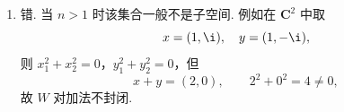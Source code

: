 \begin{enumerate}
\begin{enumerate}
        \item 错. 当 $n>1$ 时该集合一般不是子空间. 例如在 $\mathbf{C}^2$ 中取
        \[
            x=(1,\i),\quad y=(1,-\i),
        \]
        则 $x_1^2+x_2^2=0$，$y_1^2+y_2^2=0$，但
        \[
            x+y=(2,0),\qquad 2^2+0^2=4\neq0,
        \]
        故 $W$ 对加法不封闭.
    \end{enumerate}
\end{enumerate}

\clearpage
